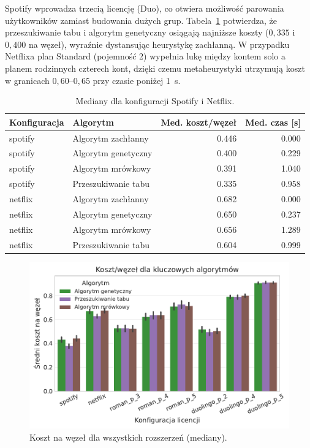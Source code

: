 Spotify wprowadza trzecią licencję (Duo), co otwiera możliwość parowania użytkowników zamiast budowania dużych grup. Tabela~\ref{tab:ext-additional-static} potwierdza, że przeszukiwanie tabu i algorytm genetyczny osiągają najniższe koszty ($0{,}335$ i $0{,}400$ na węzeł), wyraźnie dystansując heurystykę zachłanną. W przypadku Netflixa plan Standard (pojemność 2) wypełnia lukę między kontem solo a planem rodzinnych czterech kont, dzięki czemu metaheurystyki utrzymują koszt w granicach $0{,}60$--$0{,}65$ przy czasie poniżej 1~s.

\begin{table}[H]
  \centering
  \caption{Mediany dla konfiguracji Spotify i Netflix.}
  \label{tab:ext-additional-static}
  \begin{tabular}{llrr}
    \toprule
    \textbf{Konfiguracja} & \textbf{Algorytm}   & \textbf{Med. koszt/węzeł} & \textbf{Med. czas [s]} \\
    \midrule
    spotify               & Algorytm zachłanny  & 0.446                     & 0.000                  \\
    spotify               & Algorytm genetyczny & 0.400                     & 0.229                  \\
    spotify               & Algorytm mrówkowy   & 0.391                     & 1.040                  \\
    spotify               & Przeszukiwanie tabu & 0.335                     & 0.958                  \\
    netflix               & Algorytm zachłanny  & 0.682                     & 0.000                  \\
    netflix               & Algorytm genetyczny & 0.650                     & 0.237                  \\
    netflix               & Algorytm mrówkowy   & 0.656                     & 1.289                  \\
    netflix               & Przeszukiwanie tabu & 0.604                     & 0.999                  \\
  \end{tabular}
\end{table}

\begin{figure}[H]
  \centering
  \includegraphics[width=0.6\linewidth]{assets/figures/extensions/static/cost_per_node_by_license_targets.pdf}
  \caption{Koszt na węzeł dla wszystkich rozszerzeń (mediany).}
  \label{fig:ext-license-cost}
\end{figure}


